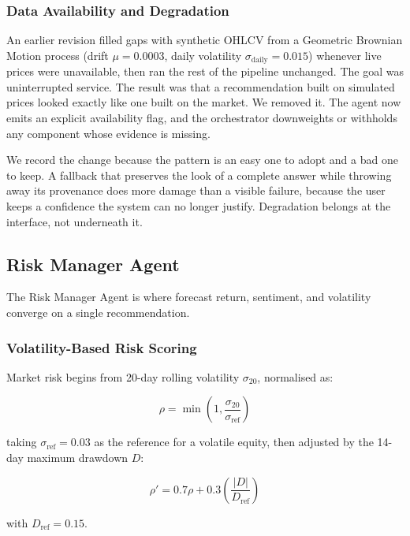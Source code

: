 \documentclass[conference]{IEEEtran}
\begin{document}
\subsubsection{Data Availability and Degradation}

An earlier revision filled gaps with synthetic OHLCV from a Geometric Brownian Motion process (drift $\mu = 0.0003$, daily volatility $\sigma_{\mathrm{daily}} = 0.015$) whenever live prices were unavailable, then ran the rest of the pipeline unchanged. The goal was uninterrupted service. The result was that a recommendation built on simulated prices looked exactly like one built on the market. We removed it. The agent now emits an explicit availability flag, and the orchestrator downweights or withholds any component whose evidence is missing.

We record the change because the pattern is an easy one to adopt and a bad one to keep. A fallback that preserves the look of a complete answer while throwing away its provenance does more damage than a visible failure, because the user keeps a confidence the system can no longer justify. Degradation belongs at the interface, not underneath it.

\subsection{Risk Manager Agent}

The Risk Manager Agent is where forecast return, sentiment, and volatility converge on a single recommendation.

\subsubsection{Volatility-Based Risk Scoring}

Market risk begins from 20-day rolling volatility $\sigma_{20}$, normalised as:

\begin{equation}
\rho = \min\left(1, \frac{\sigma_{20}}{\sigma_{\mathrm{ref}}}\right)
\end{equation}

taking $\sigma_{\mathrm{ref}}=0.03$ as the reference for a volatile equity, then adjusted by the 14-day maximum drawdown $D$:

\begin{equation}
\rho' = 0.7\rho + 0.3\left(\frac{|D|}{D_{\mathrm{ref}}}\right)
\end{equation}

with $D_{\mathrm{ref}}=0.15$.
\end{document}
